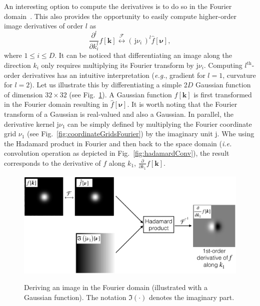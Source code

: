 \documentclass[fleqn,a4paper,oneside,openany]{book}
\begin{document}
An interesting option to compute the derivatives is to do so in the Fourier domain~\cite{DeF2017}.
This also provides the opportunity to easily compute higher-order image derivatives of order $l$ as
%
\begin{equation}\label{eq:FourierDerivative}
\frac{\partial^l}{\partial k_i^l} f[\boldsymbol{k}] \overset{\mathcal{F}}{\longleftrightarrow} (\,\mathrm{j}\nu_i\,)^l \hat{f}[\boldsymbol{\nu}],
\end{equation}
%
where $1\leq i \leq D$.
It can be noticed that differentiating an image along the direction $k_i$ only requires multiplying its Fourier transform by $\mathrm{j}\nu_i$.
Computing $l^{\text{th}}$-order derivatives has an intuitive interpretation (\emph{e.g.}, gradient for $l=1$, curvature for $l=2$).
Let us illustrate this by differentiating a simple 2$D$ Gaussian function of dimension $32\times 32$ (see Fig.~\ref{fig:GaussianDerivative}).
A Gaussian function $f[\boldsymbol{k}]$ is first transformed in the Fourier domain resulting in $\hat{f}[\boldsymbol{\nu}]$. It is worth noting that the Fourier transform of a Gaussian is real-valued and also a Gaussian.
In parallel, the derivative kernel $\mathrm{j}\nu_1$ can be simply defined by multiplying the Fourier coordinate grid $\nu_1$ (see Fig.~\ref{fig:coordinateGridsFourier}) by the imaginary unit $\mathrm{j}$.
Whe using the Hadamard product in Fourier and then back to the space domain (\emph{i.e.} convolution operation as depicted in Fig.~\ref{fig:hadamardConv}), the result corresponds to the derivative of $f$ along $k_1$, $\frac{\partial}{\partial k_1} f[\boldsymbol{k}]$.
%
\begin{figure}
\centering
\includegraphics[trim = 0 0 0 0, clip, width=1\linewidth]{GaussianDerivative.png}\\
\caption{Deriving an image in the Fourier domain (illustrated with a Gaussian function). The notation $\Im(\cdot)$ denotes the imaginary part.}
  \label{fig:GaussianDerivative}
\end{figure}
%
\end{document}
